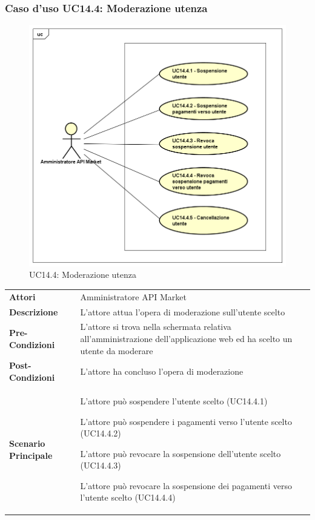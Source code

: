 \newpage
\subsubsection{Caso d'uso UC14.4: Moderazione utenza}
\label{UC14_4}
\begin{figure}[ht]
	\centering
	\includegraphics[scale=0.45]{UML/UC14_4.png}
	\caption{UC14.4: Moderazione utenza}
\end{figure}

\begin{minipage}{\linewidth}
	\begin{tabular}{ l | p{11cm}}
		\hline
		\rowcolor{Gray}
		\multicolumn{2}{c}{UC14.4 - Moderazione utenza} \\
		\hline
		\textbf{Attori} &  Amministratore API Market \\
		\textbf{Descrizione} & L'attore attua l'opera di moderazione sull'utente scelto \\
		\textbf{Pre-Condizioni} & L'attore si trova nella schermata relativa all'amministrazione dell'applicazione web ed ha scelto un utente da moderare \\
		\textbf{Post-Condizioni} & L'attore ha concluso l'opera di moderazione \\
		\textbf{Scenario Principale} & 
		\begin{enumerate*}[label=(\arabic*.),itemjoin={\newline}]
			\item L'attore può sospendere l'utente scelto (UC14.4.1)
			\item L'attore può sospendere i pagamenti verso l'utente scelto (UC14.4.2)
			\item L'attore può revocare la sospensione dell'utente scelto (UC14.4.3)
			\item L'attore può revocare la sospensione dei pagamenti verso l'utente scelto (UC14.4.4)
		\end{enumerate*}\\
	\end{tabular}
\end{minipage}

